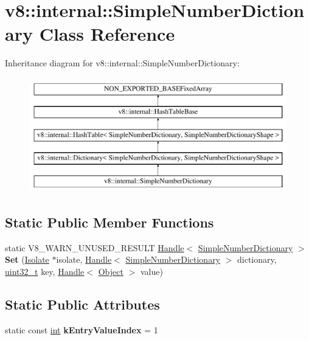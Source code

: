 \hypertarget{classv8_1_1internal_1_1SimpleNumberDictionary}{}\section{v8\+:\+:internal\+:\+:Simple\+Number\+Dictionary Class Reference}
\label{classv8_1_1internal_1_1SimpleNumberDictionary}
Inheritance diagram for v8\+:\+:internal\+:\+:Simple\+Number\+Dictionary\+:\begin{figure}[H]
\begin{center}
\leavevmode
\includegraphics[height=5.000000cm]{classv8_1_1internal_1_1SimpleNumberDictionary}
\end{center}
\end{figure}
\subsection*{Static Public Member Functions}
\begin{DoxyCompactItemize}
\item 
\mbox{\label{classv8_1_1internal_1_1SimpleNumberDictionary_aedfb82fcc03114cdd07b4060d8fda5ef}} 
static V8\+\_\+\+W\+A\+R\+N\+\_\+\+U\+N\+U\+S\+E\+D\+\_\+\+R\+E\+S\+U\+LT \mbox{\hyperlink{classv8_1_1internal_1_1Handle}{Handle}}$<$ \mbox{\hyperlink{classv8_1_1internal_1_1SimpleNumberDictionary}{Simple\+Number\+Dictionary}} $>$ {\bfseries Set} (\mbox{\hyperlink{classv8_1_1internal_1_1Isolate}{Isolate}} $\ast$isolate, \mbox{\hyperlink{classv8_1_1internal_1_1Handle}{Handle}}$<$ \mbox{\hyperlink{classv8_1_1internal_1_1SimpleNumberDictionary}{Simple\+Number\+Dictionary}} $>$ dictionary, \mbox{\hyperlink{classuint32__t}{uint32\+\_\+t}} key, \mbox{\hyperlink{classv8_1_1internal_1_1Handle}{Handle}}$<$ \mbox{\hyperlink{classv8_1_1internal_1_1Object}{Object}} $>$ value)
\end{DoxyCompactItemize}
\subsection*{Static Public Attributes}
\begin{DoxyCompactItemize}
\item 
\mbox{\label{classv8_1_1internal_1_1SimpleNumberDictionary_a75b47da151b15ceb8d74d872782b2aad}} 
static const \mbox{\hyperlink{classint}{int}} {\bfseries k\+Entry\+Value\+Index} = 1
\end{DoxyCompactItemize}
